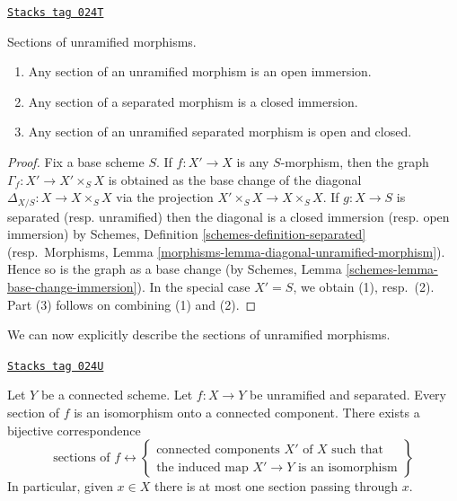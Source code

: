 \begin{proposition}
\label{etale-proposition-properties-sections}
\href{https://stacks.math.columbia.edu/tag/024T}{\texttt{Stacks tag 024T}}

Sections of unramified morphisms.
\begin{enumerate}
\item Any section of an unramified morphism is an open immersion.
\item Any section of a separated morphism is a closed immersion.
\item Any section of an unramified separated morphism is open and closed.
\end{enumerate}
\end{proposition}

\begin{proof}
Fix a base scheme $S$.
If $f : X' \to X$ is any $S$-morphism, then the graph
$\Gamma_f : X' \to X' \times_S X$
is obtained as the base change of the diagonal
$\Delta_{X/S} : X \to X \times_S X$ via the projection
$X' \times_S X \to X \times_S X$.
If $g : X \to S$ is separated (resp. unramified)
then the diagonal is a closed immersion (resp. open immersion)
by Schemes, Definition \ref{schemes-definition-separated}
(resp.\ Morphisms, Lemma \ref{morphisms-lemma-diagonal-unramified-morphism}).
Hence so is the graph as a base change (by
Schemes, Lemma \ref{schemes-lemma-base-change-immersion}).
In the special case $X' = S$, we obtain (1), resp.\ (2).
Part (3) follows on combining (1) and (2).
\end{proof}

We can now explicitly describe the sections of unramified morphisms.

\begin{theorem}
\label{etale-theorem-sections-unramified-maps}
\href{https://stacks.math.columbia.edu/tag/024U}{\texttt{Stacks tag 024U}}

Let $Y$ be a connected scheme.
Let $f : X \to Y$ be unramified and separated.
Every section of $f$ is an isomorphism onto a connected component.
There exists a bijective correspondence
$$
\text{sections of }f
\leftrightarrow
\left\{
\begin{matrix}
\text{connected components }X'\text{ of }X\text{ such that}\\
\text{the induced map }X' \to Y\text{ is an isomorphism}
\end{matrix}
\right\}
$$
In particular, given $x \in X$ there is at most one
section passing through $x$.
\end{theorem}

